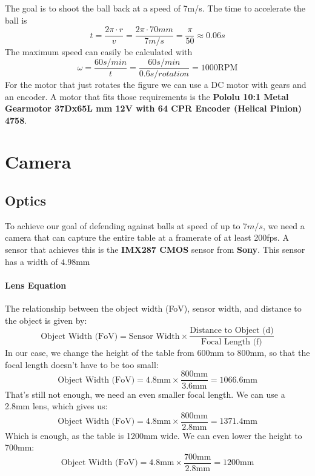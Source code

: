 The goal is to shoot the ball back at a speed of 7m/s.
The time to accelerate the ball is
\begin{equation}
    \label{eq:time}
    t = \frac{2\pi\cdot r}{v} = \frac{2\pi\cdot 70mm}{7m/s} = \frac{\pi}{50} \approx 0.06s
\end{equation}
The maximum speed can easily be calculated with
\begin{equation}
    \label{eq:max_speed}
    \omega = \frac{60s/min}{t} = \frac{60s/min}{0.6s/rotation} = 1000\text{RPM}
\end{equation}
For the motor that just rotates the figure we can use a DC motor with gears and an encoder.
A motor that fits those requirements is the \textbf{Pololu 10:1 Metal Gearmotor 37Dx65L mm 12V with 64 CPR Encoder (Helical Pinion) 4758}.


\section{Camera}\label{sec:camera}

\subsection{Optics}\label{subsec:lens}
To achieve our goal of defending against balls at speed of up to $7m/s$, we need a camera that can capture the entire table at a framerate of at least 200fps.
A sensor that achieves this is the \textbf{IMX287 CMOS} sensor from \textbf{Sony}.
This sensor has a width of $4.98\text{mm}$
\paragraph{Lens Equation}\label{par:lens_equation}

The relationship between the object width (FoV), sensor width, and distance to the object is given by:
\begin{equation}
    \text{Object Width (FoV)} = \text{Sensor Width} \times \frac{\text{Distance to Object (d)}}{\text{Focal Length (f)}}\label{eq:lens_equation}
\end{equation}
In our case, we change the height of the table from 600mm to 800mm, so that the focal length doesn't have to be too small:
\begin{equation}
    \label{eq:object_width_general}
    \text{Object Width (FoV)} = 4.8\text{mm} \times \frac{800\text{mm}}{3.6\text{mm}} = 1066.6\text{mm}
\end{equation}
That's still not enough, we need an even smaller focal length.
We can use a 2.8mm lens, which gives us:
\begin{equation}
    \label{eq:object_width_2.8mm}
    \text{Object Width (FoV)} = 4.8\text{mm} \times \frac{800\text{mm}}{2.8\text{mm}} = 1371.4\text{mm}
\end{equation}
Which is enough, as the table is 1200mm wide.
We can even lower the height to 700mm:
\begin{equation}
    \label{eq:object_width_2.8mm_700mm}
    \text{Object Width (FoV)} = 4.8\text{mm} \times \frac{700\text{mm}}{2.8\text{mm}} = 1200\text{mm}
\end{equation}